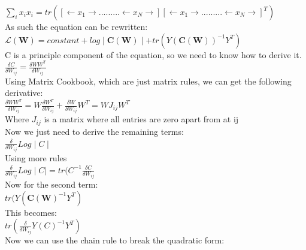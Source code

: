 \documentclass[a4paper, 9pt]{article}
\begin{document}
\( \sum\limits_i x_{i}x_{i} = tr([\leftarrow x_{1} \rightarrow.........\leftarrow x_{N} \rightarrow][\leftarrow x_{1} \rightarrow.........\leftarrow x_{N} \rightarrow]^{T}) \) \\
\newline
As such the equation can be rewritten: \\ 

\( \mathcal{L}(\mathbf{W}) = constant + log\mid \mathbf{C}(\mathbf{W})\mid + tr(Y(\mathbf{C}(\mathbf{W}))^{-1}Y^T) \) \\
\newline
C is a principle component of the equation, so we need to know how to derive it.\\

\( \frac{\delta C}{\delta W_{ij}} = \frac{\delta WW^T}{\delta W_{ij}} \) \\
\newline
Using Matrix Cookbook, which are just matrix rules, we can get the following derivative: \\ 

\( \frac{\delta WW^T}{\delta W_{ij}} = W\frac{\delta W^T}{\delta W_{ij}} + \frac{\delta W}{\delta W_{ij}} W^T = WJ_{ij}W^T \) \\

Where \( J_{ij} \) is a matrix where all entries are zero apart from at ij \\
\newline
Now we just need to derive the remaining terms: \\

\( \frac{\delta}{\delta W_{ij}} Log \mid C \mid \) \\
\newline
Using more rules \\

\( \frac{\delta}{\delta W_{ij}} Log \mid C \mid = tr(C^{-1} \frac{\delta C}{\delta W_{ij}} \) \\
\newline
Now for the second term: \\

\( tr(Y (\mathbf{C}(\mathbf{W})^{-1}Y^T) \) \\
\newline
This becomes: \\

\( tr(\frac{\delta}{\delta W_{ij}} Y(C)^{-1}Y^T) \) \\
\newline
Now we can use the chain rule to break the quadratic form: \\
\end{document}
